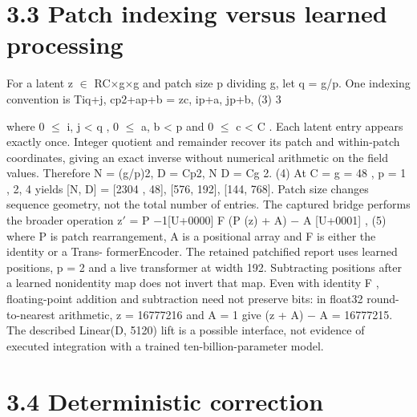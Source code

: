 \documentclass[11pt]{article}
\begin{document}
\section*{3.3 Patch indexing versus learned processing}

For a latent z \ensuremath{\in} RC\ensuremath{\times}g\ensuremath{\times}g and patch size p dividing g, let q = g/p. One indexing convention is
Tiq+j, cp2+ap+b = zc, ip+a, jp+b, (3)
3

where 0 \ensuremath{\leq} i, j < q , 0 \ensuremath{\leq} a, b < p and 0 \ensuremath{\leq} c < C . Each latent entry appears exactly once. Integer
quotient and remainder recover its patch and within-patch coordinates, giving an exact inverse
without numerical arithmetic on the field values. Therefore
N = (g/p)2, D = Cp2, N D = Cg 2. (4)
At C = g = 48 , p = 1 , 2, 4 yields [N, D] = [2304 , 48], [576, 192], [144, 768]. Patch size changes
sequence geometry, not the total number of entries.
The captured bridge performs the broader operation
z\ensuremath{\prime} = P \ensuremath{-}1[U+0000]
F (P (z) + A) \ensuremath{-} A
[U+0001]
, (5)
where P is patch rearrangement, A is a positional array and F is either the identity or a Trans-
formerEncoder. The retained patchified report uses learned positions, p = 2 and a live transformer
at width 192. Subtracting positions after a learned nonidentity map does not invert that map.
Even with identity F , floating-point addition and subtraction need not preserve bits: in float32
round-to-nearest arithmetic, z = 16777216 and A = 1 give (z + A) \ensuremath{-} A = 16777215. The described
Linear(D, 5120) lift is a possible interface, not evidence of executed integration with a trained
ten-billion-parameter model.

\section*{3.4 Deterministic correction}
\end{document}
